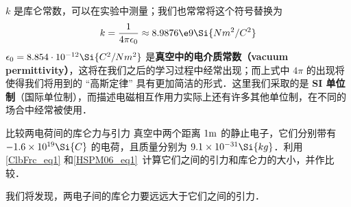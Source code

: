 $k$ 是库仑常数，可以在实验中测量；我们也常常将这个符号替换为
\begin{equation}
k = \frac{1}{4\pi\epsilon_0} \approx 8.9876\e9 \Si{N m^2/C^2}
\end{equation}
$\epsilon_0=8.854\cdot 10^{-12} \Si{C^2/Nm^2}$ 是\textbf{真空中的电介质常数（vacuum permittivity）}，这将在我们之后的学习过程中经常出现；而上式中 $4\pi$ 的出现将使得我们将用到的 “高斯定律” 具有更加简洁的形式．这里我们采取的是\textbf{ SI 单位制}（国际单位制），而描述电磁相互作用力实际上还有许多其他单位制，在不同的场合中经常被使用．

\begin{exercise}{比较两电荷间的库仑力与引力}
真空中两个距离 $1 \rm m$ 的静止电子，它们分别带有 $-1.6\times 10^{19} \Si{C}$ 的电荷，且质量分别为 $9.1\times 10^{-31} \Si{kg}$．利用\autoref{ClbFrc_eq1} 和\autoref{HSPM06_eq1}~计算它们之间的引力和库仑力的大小，并作比较．
\end{exercise}
我们将发现，两电子间的库仑力要远远大于它们之间的引力．